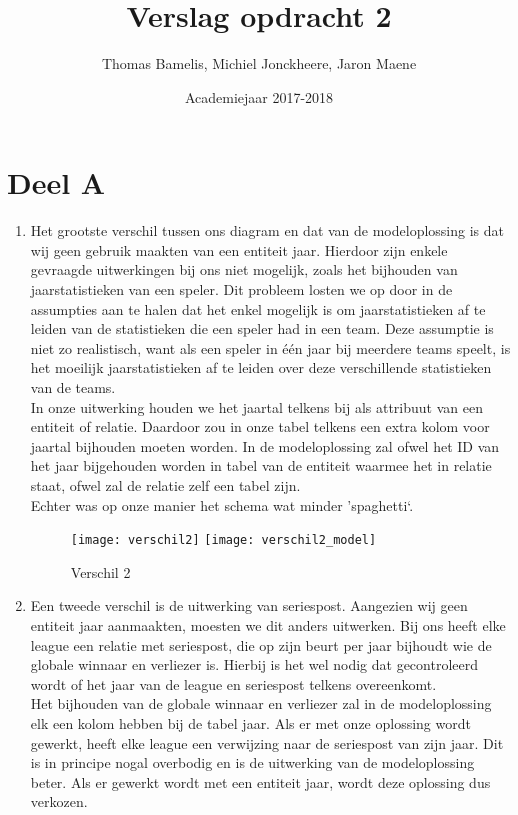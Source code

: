 \documentclass[a4paper,kulak]{kulakarticle}
\date{Academiejaar 2017-2018}
\title{Verslag opdracht 2}
\author{Thomas Bamelis, Michiel Jonckheere, Jaron Maene}
\begin{document}
\maketitle


\section{Deel A}
\begin{enumerate}
		\begin{figure}[!htb]
			\centering
			\texttt{[image: verschil1\_model]}
			\caption{Verschil 1}
			\label{fig:verschil1}
		\end{figure}
	\item Het grootste verschil tussen ons diagram en dat van de modeloplossing is dat wij geen gebruik maakten van een entiteit jaar. Hierdoor zijn enkele gevraagde uitwerkingen bij ons niet mogelijk, zoals het bijhouden van jaarstatistieken van een speler. Dit probleem losten we op door in de assumpties aan te halen dat het enkel mogelijk is om jaarstatistieken af te leiden van de statistieken die een speler had in een team. Deze assumptie is niet zo realistisch, want als een speler in één jaar bij meerdere teams speelt, is het moeilijk jaarstatistieken af te leiden over deze verschillende statistieken van de teams.\\
	In onze uitwerking houden we het jaartal telkens bij als attribuut van een entiteit of relatie. Daardoor zou in onze tabel telkens een extra kolom voor jaartal bijhouden moeten worden. In de modeloplossing zal ofwel het ID van het jaar bijgehouden worden in tabel van de entiteit waarmee het in relatie staat, ofwel zal de relatie zelf een tabel zijn. \\
	Echter was op onze manier het schema wat minder 'spaghetti`.
	
		\begin{figure}[!htb]
			\centering
			\texttt{[image: verschil2]}
			\texttt{[image: verschil2\_model]}
			\caption{Verschil 2}
			\label{fig:verschil2}
		\end{figure}
	\item Een tweede verschil is de uitwerking van seriespost. Aangezien wij geen entiteit jaar aanmaakten, moesten we dit anders uitwerken. Bij ons heeft elke league een relatie met seriespost, die op zijn beurt per jaar bijhoudt wie de globale winnaar en verliezer is. Hierbij is het wel nodig dat gecontroleerd wordt of het jaar van de league en seriespost telkens overeenkomt. \\
	Het bijhouden van de globale winnaar en verliezer zal in de modeloplossing elk een kolom hebben bij de tabel jaar. Als er met onze oplossing wordt gewerkt, heeft elke league een verwijzing naar de seriespost van zijn jaar. Dit is in principe nogal overbodig en is de uitwerking van de modeloplossing beter.	Als er gewerkt wordt met een entiteit jaar, wordt deze oplossing dus verkozen.
	

\end{enumerate}
\end{document}
